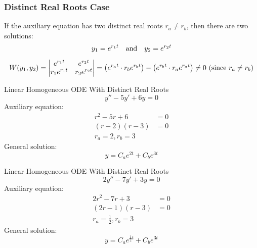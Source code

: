 \documentclass[12pt]{article}
\begin{document}
\subsubsection{Distinct Real Roots Case}
\label{sssec:distinctRealRootsCase}

If the auxiliary equation has two distinct real roots $r_a \neq r_b$, then there are two solutions:
\begin{equation*}
  y_1 = e^{r_1t}\ \ \ \textup{and}\ \ \ y_2 = e^{r_2t}
\end{equation*}

\begin{equation*}
  W(y_1,y_2) = 
  \begin{vmatrix}
    e^{r_1t} & e^{r_2t} \\
    r_1e^{r_1t} & r_2e^{r_2t} \\
  \end{vmatrix} = 
  \left( e^{r_at} \cdot r_be^{r_bt} \right) - \left( e^{r_bt} \cdot r_ae^{r_at} \right) \neq 0\ (\textup{since $r_a \neq r_b$})
\end{equation*}

\begin{example}{Linear Homogeneous ODE With Distinct Real Roots}
  \begin{equation*}
    y'' - 5y' + 6y = 0
  \end{equation*}
  Auxiliary equation:
  \begin{align*}
    r^2 - 5r + 6 &= 0 \\
    (r-2)(r-3) &= 0 \\
    r_a = 2, r_b = 3
  \end{align*}
  General solution:
  \begin{equation*}
    y = C_ae^{2t} + C_be^{3t}
  \end{equation*}
\end{example}

\begin{example}{Linear Homogeneous ODE With Distinct Real Roots}
  \begin{equation*}
    2y'' - 7y' + 3y = 0
  \end{equation*}
  Auxiliary equation:
  \begin{align*}
    2r^2 - 7r + 3 &= 0 \\
    (2r-1)(r-3) &= 0 \\
    r_a = \frac{1}{2}, r_b = 3
  \end{align*}
  General solution:
  \begin{equation*}
    y = C_ae^{\frac{1}{2}t} + C_be^{3t}
  \end{equation*}
\end{example}
\end{document}
